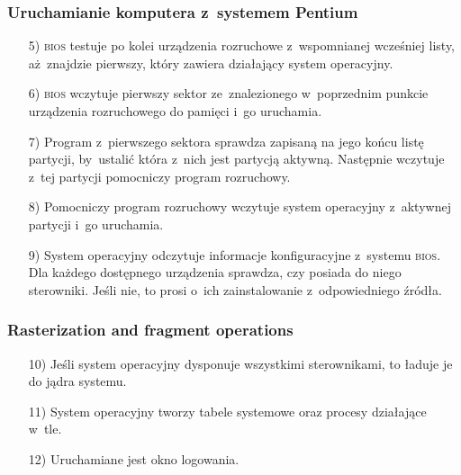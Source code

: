 \documentclass[10pt,t]{beamer}
\begin{document}
\begin{frame}
  \frametitle{Uruchamianie komputera z~systemem Pentium}


  \begin{itemize}

  \item[5)] \textsc{bios} testuje po kolei urządzenia rozruchowe
    z~wspomnianej wcześniej listy, aż~znajdzie pierwszy, który zawiera
    działający system operacyjny.

  \item[6)] \textsc{bios} wczytuje pierwszy sektor ze~znalezionego
    w~poprzednim punkcie urządzenia rozruchowego do pamięci i~go uruchamia.

  \item[7)] Program z~pierwszego sektora sprawdza zapisaną na jego końcu
    listę partycji, by~ustalić która z~nich jest partycją aktywną.
    Następnie wczytuje z~tej partycji pomocniczy program rozruchowy.

  \item[8)] Pomocniczy program rozruchowy wczytuje system operacyjny
    z~aktywnej partycji i~go uruchamia.

  \item[9)] System operacyjny odczytuje informacje konfiguracyjne z~systemu
    \textsc{bios}. Dla każdego dostępnego urządzenia sprawdza, czy posiada
    do niego sterowniki. Jeśli nie, to prosi o~ich zainstalowanie
    z~odpowiedniego źródła.

  \end{itemize}

\end{frame}





\begin{frame}
  \frametitle{Rasterization and fragment operations}


  \begin{itemize}

  \item[10)] Jeśli system operacyjny dysponuje wszystkimi sterownikami,
    to ładuje je do jądra systemu.

  \item[11)] System operacyjny tworzy tabele systemowe oraz procesy
    działające w~tle.

  \item[12)] Uruchamiane jest okno logowania.

  \end{itemize}

\end{frame}
\end{document}
